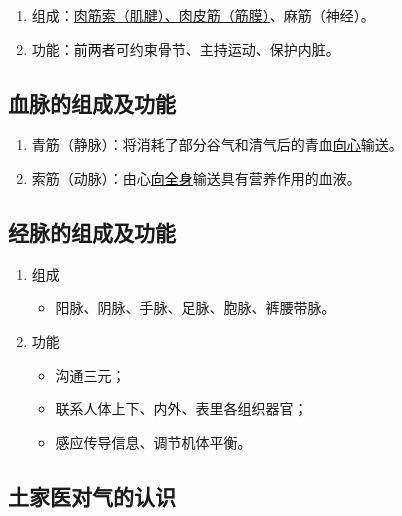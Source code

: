 \documentclass[cn,hazy,black,12pt,normal,founder]{elegantnote}
\newcommand{\redt}[1]{\textcolor{black}{{}#1}}      %
\begin{document}
\begin{enumerate}
  \item 组成：\uline{肉筋索（肌腱）、肉皮筋（筋膜）}、麻筋（神经）。
  \item 功能：\redt{前两者}可约束骨节、主持运动、保护内脏。
\end{enumerate}

\subsection{血脉的组成及功能}

\begin{enumerate}
  \item 青筋（静脉）：将消耗了部分谷气和清气后的青血\redt{\uline{向心}}输送。
  \item 索筋（动脉）：由心\redt{\uline{向全身}}输送具有营养作用的血液。
\end{enumerate}

\subsection{经脉的组成及功能}

\begin{enumerate}
  \item 组成
  \begin{itemize}
    \item 阳脉、阴脉、手脉、足脉、胞脉、裤腰带脉。
  \end{itemize}
  \item 功能
  \begin{itemize}
    \item 沟通三元；
    \item 联系人体上下、内外、表里各组织器官；
    \item 感应传导信息、调节机体平衡。
  \end{itemize}
\end{enumerate}

\subsection{土家医对气的认识}
\end{document}
